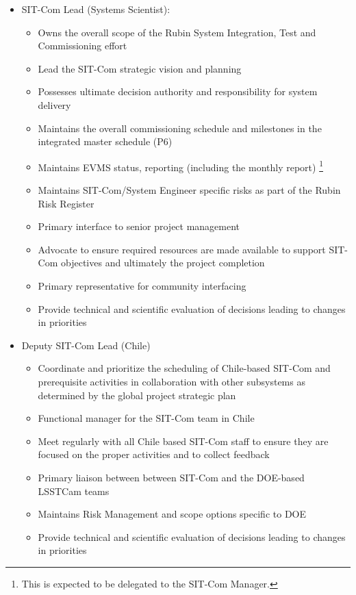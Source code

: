 \documentclass[SE,lsstdraft,authoryear,toc]{lsstdoc}
\begin{document}
\begin{itemize}
    \item SIT-Com Lead (Systems Scientist):
    \begin{itemize}
        \item Owns the overall scope of the Rubin System Integration, Test and Commissioning effort
        \item Lead the SIT-Com strategic vision and planning
        \item Possesses ultimate decision authority and responsibility for system delivery
        \item Maintains the overall commissioning schedule and milestones in the integrated master schedule (P6)
        \item Maintains EVMS status, reporting (including the monthly report) \footnote{This is expected to be delegated to the SIT-Com Manager.}
        \item Maintains SIT-Com/System Engineer specific risks as part of the Rubin Risk Register
        \item Primary interface to senior project management
        \item Advocate to ensure required resources are made available to support SIT-Com objectives and ultimately the project completion
        \item Primary representative for community interfacing
        \item Provide technical and scientific evaluation of decisions leading to changes in priorities
    \end{itemize}
    \item Deputy SIT-Com Lead (Chile)
    \begin{itemize}
        \item Coordinate and prioritize the scheduling of Chile-based SIT-Com and prerequisite activities in collaboration with other subsystems as determined by the global project strategic plan
        \item Functional manager for the SIT-Com team in Chile
        \item Meet regularly with all Chile based SIT-Com staff to ensure they are focused on the proper activities and to collect feedback
        \item Primary liaison between between SIT-Com and the DOE-based LSSTCam teams
        \item Maintains Risk Management and scope options specific to DOE
        \item Provide technical and scientific evaluation of decisions leading to changes in priorities

\end{itemize}
\end{itemize}
\end{document}
